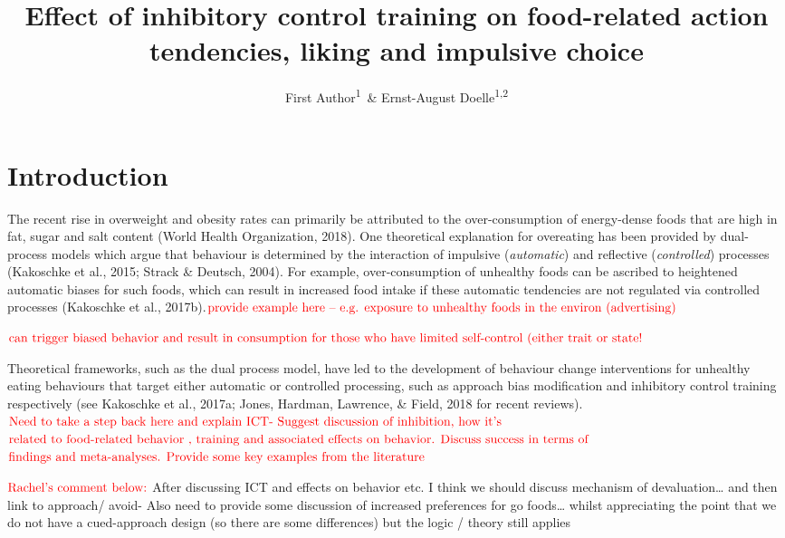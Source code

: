 \documentclass[man]{apa6}
\title{Effect of inhibitory control training on food-related action tendencies, liking and impulsive choice}
\author{First Author\textsuperscript{1}~\& Ernst-August Doelle\textsuperscript{1,2}}
\date{}
\affiliation{
\vspace{0.5cm}
\textsuperscript{1} Wilhelm-Wundt-University\\\textsuperscript{2} Konstanz Business School}
\begin{document}
\maketitle

\hypertarget{introduction}{%
\section{Introduction}\label{introduction}}

\par

The recent rise in overweight and obesity rates can primarily be attributed to the over-consumption of energy-dense foods that are high in fat, sugar and salt content (World Health Organization, 2018). One theoretical explanation for overeating has been provided by dual-process models which argue that behaviour is determined by the interaction of impulsive (\emph{automatic}) and reflective (\emph{controlled}) processes (Kakoschke et al., 2015; Strack \& Deutsch, 2004). For example, over-consumption of unhealthy foods can be ascribed to heightened automatic biases for such foods, which can result in increased food intake if these automatic tendencies are not regulated via controlled processes (Kakoschke et al., 2017b).\(\color{red}{\text{provide example here – e.g. exposure to unhealthy foods in the environ (advertising)}}\)

\(\color{red}{\text{can trigger biased behavior and result in consumption for those who have limited self-control (either trait or state!}}\)

\par

Theoretical frameworks, such as the dual process model, have led to the development of behaviour change interventions for unhealthy eating behaviours that target either automatic or controlled processing, such as approach bias modification and inhibitory control training respectively (see Kakoschke et al., 2017a; Jones, Hardman, Lawrence, \& Field, 2018 for recent reviews). \(\color{red}{\text{Need to take a step back here and explain ICT- Suggest discussion of inhibition, how it’s}}\)
\(\color{red}{\text{related to food-related behavior , training and associated effects on behavior. Discuss success in terms of }}\)
\(\color{red}{\text{findings and meta-analyses. Provide some key examples from the literature}}\)

\par

\(\color{red}\text{{Rachel's comment below:}}\)
After discussing ICT and effects on behavior etc. I think we should discuss mechanism of devaluation\ldots{} and then link to approach/ avoid- Also need to provide some discussion of increased preferences for go foods\ldots{} whilst appreciating the point that we do not have a cued-approach design (so there are some differences) but the logic / theory still applies
\end{document}
